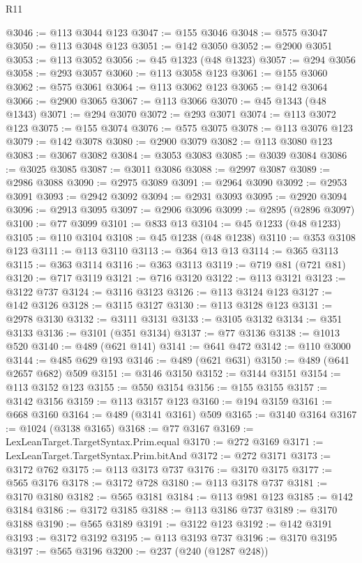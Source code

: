\begin{lexlean}{R11}
\begin{coremodule}
{{{{{{{{{{{{{{{{{{{{{{{{{{{{{{{{{{{{{{{{{{{{{{{{{{{{{{{{{{{{{{{{{{{{{{{{{{{{{{{{{{{{{{{{{{{{{{{{{{{{{{{{{{@3046 := @113 @3044 @123
@3047 := @155 @3046
@3048 := @575 @3047
@3050 := @113 @3048 @123
@3051 := @142 @3050
@3052 := @2900 @3051
@3053 := @113 @3052
@3056 := @45 @1323 (@48 @1323)
@3057 := @294 @3056
@3058 := @293 @3057
@3060 := @113 @3058 @123
@3061 := @155 @3060
@3062 := @575 @3061
@3064 := @113 @3062 @123
@3065 := @142 @3064
@3066 := @2900 @3065
@3067 := @113 @3066
@3070 := @45 @1343 (@48 @1343)
@3071 := @294 @3070
@3072 := @293 @3071
@3074 := @113 @3072 @123
@3075 := @155 @3074
@3076 := @575 @3075
@3078 := @113 @3076 @123
@3079 := @142 @3078
@3080 := @2900 @3079
@3082 := @113 @3080 @123
@3083 := @3067 @3082
@3084 := @3053 @3083
@3085 := @3039 @3084
@3086 := @3025 @3085
@3087 := @3011 @3086
@3088 := @2997 @3087
@3089 := @2986 @3088
@3090 := @2975 @3089
@3091 := @2964 @3090
@3092 := @2953 @3091
@3093 := @2942 @3092
@3094 := @2931 @3093
@3095 := @2920 @3094
@3096 := @2913 @3095
@3097 := @2906 @3096
@3099 := @2895 (@2896 @3097)
@3100 := @77 @3099
@3101 := @833 @13
@3104 := @45 @1233 (@48 @1233)
@3105 := @110 @3104
@3108 := @45 @1238 (@48 @1238)
@3110 := @353 @3108 @123
@3111 := @113 @3110
@3113 := @364 @13 @13
@3114 := @365 @3113
@3115 := @363 @3114
@3116 := @363 @3113
@3119 := @719 @81 (@721 @81)
@3120 := @717 @3119
@3121 := @716 @3120
@3122 := @113 @3121
@3123 := @3122 @737
@3124 := @3116 @3123
@3126 := @113 @3124 @123
@3127 := @142 @3126
@3128 := @3115 @3127
@3130 := @113 @3128 @123
@3131 := @2978 @3130
@3132 := @3111 @3131
@3133 := @3105 @3132
@3134 := @351 @3133
@3136 := @3101 (@351 @3134)
@3137 := @77 @3136
@3138 := @1013 @520
@3140 := @489 (@621 @141)
@3141 := @641 @472
@3142 := @110 @3000
@3144 := @485 @629 @193
@3146 := @489 (@621 @631)
@3150 := @489 (@641 @2657 @682) @509
@3151 := @3146 @3150
@3152 := @3144 @3151
@3154 := @113 @3152 @123
@3155 := @550 @3154
@3156 := @155 @3155
@3157 := @3142 @3156
@3159 := @113 @3157 @123
@3160 := @194 @3159
@3161 := @668 @3160
@3164 := @489 (@3141 @3161) @509
@3165 := @3140 @3164
@3167 := @1024 (@3138 @3165)
@3168 := @77 @3167
@3169 := LexLeanTarget.TargetSyntax.Prim.equal
@3170 := @272 @3169
@3171 := LexLeanTarget.TargetSyntax.Prim.bitAnd
@3172 := @272 @3171
@3173 := @3172 @762
@3175 := @113 @3173 @737
@3176 := @3170 @3175
@3177 := @565 @3176
@3178 := @3172 @728
@3180 := @113 @3178 @737
@3181 := @3170 @3180
@3182 := @565 @3181
@3184 := @113 @981 @123
@3185 := @142 @3184
@3186 := @3172 @3185
@3188 := @113 @3186 @737
@3189 := @3170 @3188
@3190 := @565 @3189
@3191 := @3122 @123
@3192 := @142 @3191
@3193 := @3172 @3192
@3195 := @113 @3193 @737
@3196 := @3170 @3195
@3197 := @565 @3196
@3200 := @237 (@240 (@1287 @248))
}}}}}}}}}}}}}}}}}}}}}}}}}}}}}}}}}}}}}}}}}}}}}}}}}}}}}}}}}}}}}}}}}}}}}}}}}}}}}}}}}}}}}}}}}}}}}}}}}}}}}}}}}}
\end{coremodule}
\end{lexlean}
